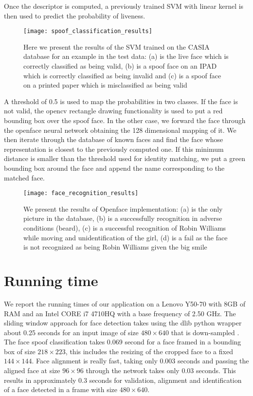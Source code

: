 Once the descriptor is computed, a previously trained SVM with linear kernel is then used to predict the probability of liveness. \begin{figure}[H]
	\captionsetup{width=15cm,font=small}
	\begin{center}
		\texttt{[image: spoof\_classification\_results]}
	\end{center}
	\caption[Results on spoof classification]{Here we present the results of the SVM trained on the CASIA database for an example in the test data: (a) is the live face which is correctly classified as being valid, (b) is a spoof face on an IPAD which is correctly classified as being invalid and (c) is a spoof face on a printed paper which is misclassified as being valid}
	\label{fig:spoof_classification_results}
\end{figure} A threshold of 0.5 is used to map the probabilities in two classes. If the face is not valid, the opencv rectangle drawing functionality is used to put a red bounding box over the spoof face. In the other case, we forward the face through the openface neural network obtaining the 128 dimensional mapping of it. We then iterate through the database of known faces and find the face whose representation is closest to the previously computed one. If this minimum distance is smaller than the threshold used for identity matching, we put a green bounding box around the face and append the name corresponding to the matched face. 
\begin{figure}[H]
	\captionsetup{width=15cm,font=small}
	\begin{center}
		\texttt{[image: face\_recognition\_results]}
	\end{center}
	\caption[Results on face recognition]{We present the results of Openface implementation: (a) is the only picture in the database, (b) is a successfully recognition in adverse conditions (beard), (c) is a successful recognition of Robin Williams while moving and unidentification of the girl, (d) is a fail as the face is not recognized as being Robin Williams given the big smile}
	\label{fig:spoof_classification_results}
\end{figure}
\section{Running time}
We report the running times of our application on a Lenovo Y50-70 with 8GB of RAM and an Intel CORE i7 4710HQ with a base frequency of 2.50 GHz. The sliding window approach for face detection takes using the dlib python wrapper about 0.25 seconds for an input image of size $480\times640$ that is down-sampled . The face spoof classification takes 0.069 second for a face framed in a bounding box of size $218\times223$, this includes the resizing of the cropped face to a fixed $144\times144$. Face alignment is really fast, taking only 0.003 seconds and passing the aligned face at size $96\times96$ through the network takes only 0.03 seconds. This results in approximately 0.3 seconds for validation, alignment and identification of a face detected in a frame with size $480\times640$.
